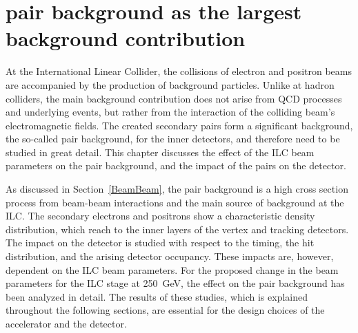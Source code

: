 \chapter{\positron\electron pair background as the largest background contribution}
\label{PairBkg}

\begin{chapterabstract}
 At the International Linear Collider, the collisions of electron and positron beams are accompanied by the production of background particles.
 Unlike at hadron colliders, the main background contribution does not arise from QCD processes and underlying events, but rather from the interaction of the colliding beam's electromagnetic fields.
 The created secondary \positron\electron pairs form a significant background, the so-called pair background, for the inner detectors, and therefore need to be studied in great detail.
 This chapter discusses the effect of the ILC beam parameters on the pair background, and the impact of the \positron\electron pairs on the \sid detector.
\end{chapterabstract}

As discussed in Section~\ref{BeamBeam}, the pair background is a high cross section process from beam-beam interactions and the main source of background at the ILC.
The secondary electrons and positrons show a characteristic density distribution, which reach to the inner layers of the \sid vertex and tracking detectors.
The impact on the \sid detector is studied with respect to the timing, the hit distribution, and the arising detector occupancy.
These impacts are, however, dependent on the ILC beam parameters.
For the proposed change in the beam parameters for the ILC stage at \SI{250}{\GeV}, the effect on the pair background has been analyzed in detail. 
The results of these studies, which is explained throughout the following sections, are essential for the design choices of the accelerator and the \sid detector.

